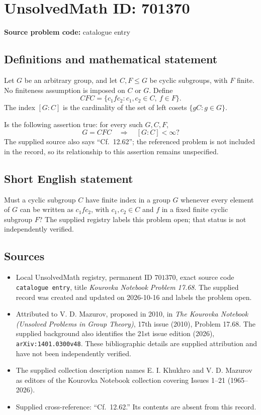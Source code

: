 \documentclass[11pt]{article}
\begin{document}
\section*{UnsolvedMath ID: 701370}
\textbf{Source problem code:} catalogue entry
\subsection{Definitions and mathematical statement}
Let \(G\) be an arbitrary group, and let \(C,F\leq G\) be cyclic subgroups, with \(F\) finite. No finiteness assumption is imposed on \(C\) or \(G\). Define
\[
CFC=\{c_1fc_2:c_1,c_2\in C,\ f\in F\}.
\]
The index \([G:C]\) is the cardinality of the set of left cosets \(\{gC:g\in G\}\).

Is the following assertion true: for every such \(G,C,F\),
\[
G=CFC\quad\Longrightarrow\quad [G:C]<\infty?
\]
The supplied source also says ``Cf.\ 12.62''; the referenced problem is not included in the record, so its relationship to this assertion remains unspecified.
\subsection{Short English statement}
Must a cyclic subgroup \(C\) have finite index in a group \(G\) whenever every element of \(G\) can be written as \(c_1fc_2\), with \(c_1,c_2\in C\) and \(f\) in a fixed finite cyclic subgroup \(F\)? The supplied registry labels this problem open; that status is not independently verified.
\subsection{Sources}
\begin{itemize}
\item Local UnsolvedMath registry, permanent ID \(701370\), exact source code \texttt{catalogue entry}, title \emph{Kourovka Notebook Problem 17.68}. The supplied record was created and updated on 2026-10-16 and labels the problem open.
\item Attributed to V. D. Mazurov, proposed in 2010, in \emph{The Kourovka Notebook (Unsolved Problems in Group Theory)}, 17th issue (2010), Problem 17.68. The supplied background also identifies the 21st issue edition (2026), \texttt{arXiv:1401.0300v48}. These bibliographic details are supplied attribution and have not been independently verified.
\item The supplied collection description names E. I. Khukhro and V. D. Mazurov as editors of the Kourovka Notebook collection covering Issues 1--21 (1965--2026).
\item Supplied cross-reference: ``Cf.\ 12.62.'' Its contents are absent from this record.
\end{itemize}
\end{document}
